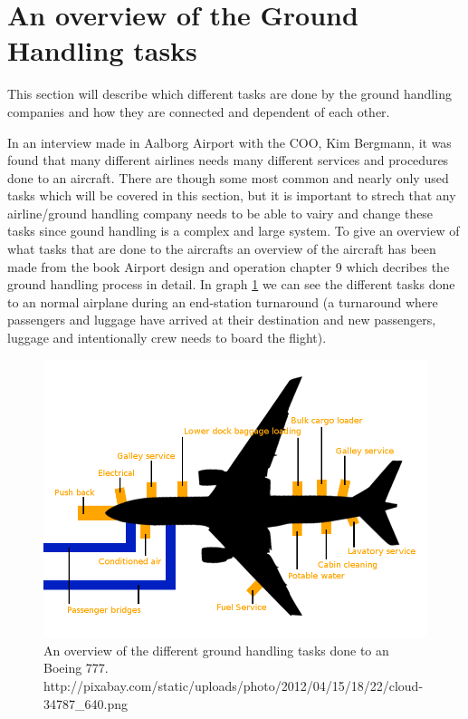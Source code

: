 \section{An overview of the Ground Handling tasks}
This section will describe which different tasks are done by the ground handling companies and how they are connected and dependent of each other.

In an interview made in Aalborg Airport with the COO, Kim Bergmann, it was found that many different airlines needs many different services and procedures done to an aircraft. There are though some most common and nearly only used tasks which will be covered in this section, but it is important to strech that any airline/ground handling company needs to be able to vairy and change these tasks since gound handling is a complex and large system. To give an overview of what tasks that are done to the aircrafts an overview of the aircraft has been made from the book Airport design and operation \cite{Airport design and operation} chapter 9 which decribes the ground handling process in detail. In graph \ref{B-777_Turnaround} we can see the different tasks done to an normal airplane during an end-station turnaround (a turnaround where passengers and luggage have arrived at their destination and new passengers, luggage and intentionally crew needs to board the flight).

\begin{figure}[H]
\centering
\includegraphics[width=\textwidth]{Grafik/B-777_Turnaround}
\caption{An overview of the different ground handling tasks done to an Boeing 777. http://pixabay.com/static/uploads/photo/2012/04/15/18/22/cloud-34787_640.png}
\label{B-777_Turnaround}
\end{figure}


